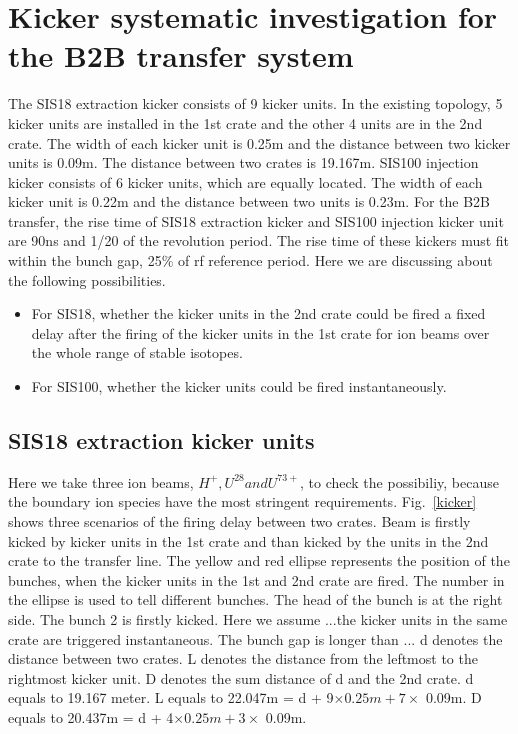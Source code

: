 \section{Kicker systematic investigation for the B2B transfer system}
The SIS18 extraction kicker consists of 9 kicker units. In the existing topology, 5 kicker units are installed in the 1st crate and the other 4 units are in the 2nd crate. The width of each kicker unit is 0.25m and the distance between two kicker units is 0.09m. The distance between two crates is 19.167m. SIS100 injection kicker consists of 6 kicker units, which are equally located. The width of each kicker unit is 0.22m and the distance between two units is 0.23m. For the B2B transfer, the rise time of SIS18 extraction kicker and SIS100 injection kicker unit are 90ns and 1/20 of the revolution period. The rise time of these kickers must fit within the bunch gap, 25$\%$ of rf reference period. Here we are discussing about the following possibilities.
\begin{itemize}
    \item For SIS18, whether the kicker units in the 2nd crate could be fired a fixed delay after the firing of the kicker units in the 1st crate for ion beams over the whole range of stable isotopes. 
    \item For SIS100, whether the kicker units could be fired instantaneously. 
\end{itemize} 

\subsection{SIS18 extraction kicker units}
Here we take three ion beams, $H^+, U^{28} and U^{73+}$, to check the possibiliy, because the boundary ion species have the most stringent requirements. Fig.~\ref{kicker} shows three scenarios of the firing delay between two crates. Beam is firstly kicked by kicker units in the 1st crate and than kicked by the units in the 2nd crate to the transfer line. The yellow and red ellipse represents the position of the bunches, when the kicker units in the 1st and 2nd crate are fired. The number in the ellipse is used to tell different bunches. The head of the bunch is at the right side. The bunch 2 is firstly kicked. Here we assume ...the kicker units in the same crate are triggered instantaneous. The bunch gap is longer than ... d denotes the distance between two crates. L denotes the distance from the leftmost to the rightmost kicker unit. D denotes the sum distance of d and the 2nd crate. d equals to 19.167 meter. L equals to 22.047m = d + 9$\times 0.25m + 7\times$ 0.09m. D equals to 20.437m = d + 4$\times 0.25m + 3\times$ 0.09m.

